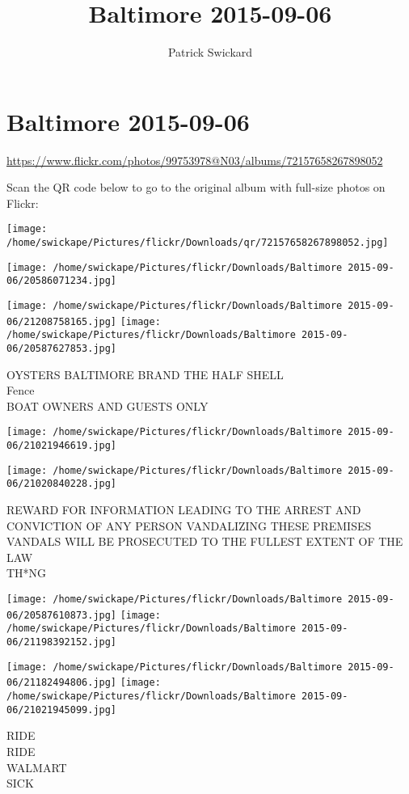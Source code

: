 \documentclass[10pt,letterpaper]{article}
\title{Baltimore 2015-09-06}
\author{Patrick Swickard}
\date{}
\begin{document}
\section*{Baltimore 2015-09-06}

\url{https://www.flickr.com/photos/99753978@N03/albums/72157658267898052}

Scan the QR code below to go to the original album with full-size photos on Flickr:

\texttt{[image: /home/swickape/Pictures/flickr/Downloads/qr/72157658267898052.jpg]}
\pagebreak

\texttt{[image: /home/swickape/Pictures/flickr/Downloads/Baltimore 2015-09-06/20586071234.jpg]}

\vspace{0.25in}
\texttt{[image: /home/swickape/Pictures/flickr/Downloads/Baltimore 2015-09-06/21208758165.jpg]}
\texttt{[image: /home/swickape/Pictures/flickr/Downloads/Baltimore 2015-09-06/20587627853.jpg]}

OYSTERS BALTIMORE BRAND THE HALF SHELL\\
Fence\\
BOAT OWNERS AND GUESTS ONLY
\pagebreak

\texttt{[image: /home/swickape/Pictures/flickr/Downloads/Baltimore 2015-09-06/21021946619.jpg]}

\vspace{0.25in}
\texttt{[image: /home/swickape/Pictures/flickr/Downloads/Baltimore 2015-09-06/21020840228.jpg]}

REWARD FOR INFORMATION LEADING TO THE ARREST AND CONVICTION OF ANY PERSON VANDALIZING THESE PREMISES VANDALS WILL BE PROSECUTED TO THE FULLEST EXTENT OF THE LAW\\
TH*NG
\pagebreak

\texttt{[image: /home/swickape/Pictures/flickr/Downloads/Baltimore 2015-09-06/20587610873.jpg]}
\texttt{[image: /home/swickape/Pictures/flickr/Downloads/Baltimore 2015-09-06/21198392152.jpg]}

\texttt{[image: /home/swickape/Pictures/flickr/Downloads/Baltimore 2015-09-06/21182494806.jpg]}
\texttt{[image: /home/swickape/Pictures/flickr/Downloads/Baltimore 2015-09-06/21021945099.jpg]}

RIDE\\
RIDE\\
WALMART\\
SICK
\pagebreak
\end{document}
